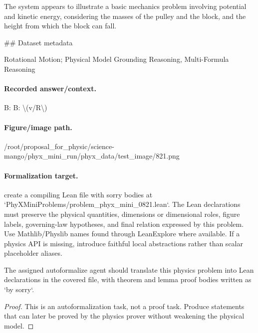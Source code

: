 The system appears to illustrate a basic mechanics problem involving potential and kinetic energy, considering the masses of the pulley and the block, and the height from which the block can fall.

\#\# Dataset metadata

Rotational Motion; Physical Model Grounding Reasoning, Multi-Formula Reasoning

\paragraph{Recorded answer/context.}
B: B: \textbackslash{}(v/R\textbackslash{})

\paragraph{Figure/image path.}
/root/proposal\_for\_physic/science-mango/phyx\_mini\_run/phyx\_data/test\_image/821.png

\paragraph{Formalization target.}
create a compiling Lean file with sorry bodies at `PhyXMiniProblems/problem\_phyx\_mini\_0821.lean`. The Lean declarations must preserve the physical quantities, dimensions or dimensional roles, figure labels, governing-law hypotheses, and final relation expressed by this problem.
Use Mathlib/Physlib names found through LeanExplore where available. If a physics API is missing, introduce faithful local abstractions rather than scalar placeholder aliases.

\begin{theorem}
\label{thm:physics:phyx_mini_0821:target}
The assigned autoformalize agent should translate this physics problem into Lean declarations in the covered file, with theorem and lemma proof bodies written as `by sorry`.
\end{theorem}
\begin{proof}
This is an autoformalization task, not a proof task. Produce statements that can later be proved by the physics prover without weakening the physical model.
\end{proof}


